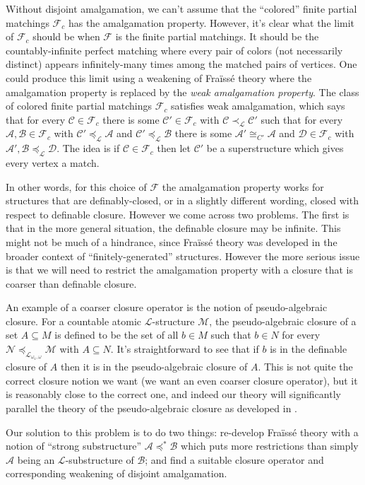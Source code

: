 \documentclass[12pt]{amsart}
\theoremstyle{plain}
\theoremstyle{definition}
\newcommand{\countlogic}{\mathcal{L}_{\omega_1, \omega}}
\newcommand{\isom}{\cong}
\newcommand{\mcA}{\mathcal{A}}
\newcommand{\mcB}{\mathcal{B}}
\newcommand{\mcC}{\mathcal{C}}
\newcommand{\mcD}{\mathcal{D}}
\newcommand{\mcF}{\mathcal{F}}
\newcommand{\mcL}{\mathcal{L}}
\newcommand{\mcM}{\mathcal{M}}
\newcommand{\mcN}{\mathcal{N}}
\begin{document}
Without disjoint amalgamation, we can't assume that the ``colored'' finite partial matchings $\mcF_c$ has the amalgamation property.
However, it's clear what the limit of $\mcF_c$ should be when $\mcF$ is the finite partial matchings.
It should be the countably-infinite perfect matching where every pair of colors (not necessarily distinct) appears infinitely-many times among the matched pairs of vertices.
One could produce this limit using a weakening of Fra\"{i}ss\'{e} theory where the amalgamation property is replaced by the \emph{weak amalgamation property}.
The class of colored finite partial matchings $\mcF_c$ satisfies weak amalgamation, which says that for every $\mcC \in \mcF_c$ there is some $\mcC' \in \mcF_c$ with $\mcC \prec_{\mcL} \mcC'$ such that for every $\mcA, \mcB \in \mcF_c$ with $\mcC' \preceq_\mcL \mcA$ and $\mcC' \preceq_\mcL \mcB$ there is some $\mcA' \isom_{C'} \mcA$ and $\mcD \in \mcF_c$ with $\mcA', \mcB \preceq_\mcL \mcD$.
The idea is if $\mcC \in \mcF_c$ then let $\mcC'$ be a superstructure which gives every vertex a match.

In other words, for this choice of $\mcF$ the amalgamation property works for structures that are definably-closed, or in a slightly different wording, closed with respect to definable closure.
However we come across two problems.
The first is that in the more general situation, the definable closure may be infinite.
This might not be much of a hindrance, since Fra\"{i}ss\'{e} theory was developed in the broader context of ``finitely-generated'' structures.
However the more serious issue is that we will need to restrict the amalgamation property with a closure that is coarser than definable closure.

An example of a coarser closure operator is the notion of pseudo-algebraic closure.
For a countable atomic $\mcL$-structure $\mcM$, the pseudo-algebraic closure of a set $A \subseteq M$ is defined to be the set of all $b \in M$ such that $b \in N$ for every $\mcN \preceq_{\countlogic} \mcM$ with $A \subseteq N$.
It's straightforward to see that if $b$ is in the definable closure of $A$ then it is in the pseudo-algebraic closure of $A$.
This is not quite the correct closure notion we want (we want an even coarser closure operator), but it is reasonably close to the correct one, and indeed our theory will significantly parallel the theory of the pseudo-algebraic closure as developed in \cite{Deissler1997}.

Our solution to this problem is to do two things: re-develop Fra\"{i}ss\'{e} theory with a notion of ``strong substructure'' $\mcA \preceq^* \mcB$ which puts more restrictions than simply $\mcA$ being an $\mcL$-substructure of $\mcB$; and find a suitable closure operator and corresponding weakening of disjoint amalgamation.
\end{document}
